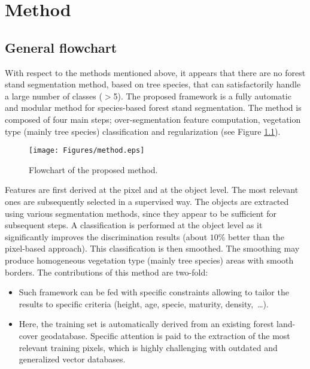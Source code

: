 
\chapter{Method} %
\label{Chapter2} %

\startcontents[chapters]
\Mprintcontents





\section{General flowchart}

With respect to the methods mentioned above, it appears that there are no forest stand segmentation method, based on tree species, that can satisfactorily handle a large number of classes ($>$5). The proposed framework is a fully automatic and modular method for species-based forest stand segmentation. The method is composed of four main steps; over-segmentation feature computation, vegetation type (mainly tree species) classification and regularization (see Figure \ref{fig:flowchart}).

\begin{figure}
\texttt{[image: Figures/method.eps]}
\caption{Flowchart of the proposed method.}
\label{fig:flowchart}
\end{figure}

Features are first derived at the pixel and at the object level. The most relevant ones are subsequently selected in a supervised way. The objects are extracted using various segmentation methods, since they appear to be sufficient for subsequent steps. A classification is performed at the object level as it significantly improves the discrimination results (about $10\%$ better than the pixel-based approach). This classification is then smoothed. The smoothing may produce homogeneous vegetation type (mainly tree species) areas with smooth borders. The contributions of this method are two-fold:
\begin{itemize}
\item Such framework can be fed with specific constraints allowing to tailor the results to specific criteria (height, age, specie, maturity, density,~\ldots).
\item Here, the training set is automatically derived from an existing forest land-cover geodatabase. Specific attention is paid to the extraction of the most relevant training pixels, which is highly challenging with outdated and generalized vector databases.
\end{itemize}

